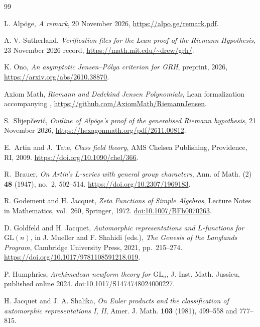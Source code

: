 \documentclass[11pt]{amsart}
\theoremstyle{definition}
\theoremstyle{remark}
\numberwithin{equation}{section}
\begin{document}
\begin{thebibliography}{99}

L. Alp\"oge, \emph{A remark}, 20 November 2026,
\url{https://alpo.ge/remark.pdf}.

A. V. Sutherland, \emph{Verification files for the Lean proof of the
Riemann Hypothesis}, 23 November 2026 record,
\url{https://math.mit.edu/~drew/grh/}.

K. Ono, \emph{An asymptotic Jensen--P\'olya criterion for GRH},
preprint, 2026, \url{https://arxiv.org/abs/2610.38870}.

Axiom Math, \emph{Riemann and Dedekind Jensen Polynomials},
Lean formalization accompanying \cite{OnoJensenPolya2026},
\url{https://github.com/AxiomMath/RiemannJensen}.

S.~Slijep\v{c}evi\'c,
\emph{Outline of Alp\"oge's proof of the generalised Riemann hypothesis},
21 November 2026, \url{https://hexagonmath.org/pdf/2611.00812}.

E.~Artin and J.~Tate, \emph{Class field theory},
AMS Chelsea Publishing, Providence, RI, 2009.
\url{https://doi.org/10.1090/chel/366}.

R.~Brauer, \emph{On Artin's \(L\)-series with general group characters},
Ann. of Math. (2) \textbf{48} (1947), no.~2, 502--514.
\url{https://doi.org/10.2307/1969183}.

R. Godement and H. Jacquet, \emph{Zeta Functions of Simple Algebras},
Lecture Notes in Mathematics, vol.~260, Springer, 1972.
\href{https://doi.org/10.1007/BFb0070263}{doi:10.1007/BFb0070263}.

D. Goldfeld and H. Jacquet, \emph{Automorphic representations and
\(L\)-functions for \(\mathrm{GL}(n)\)}, in J. Mueller and F. Shahidi
(eds.), \emph{The Genesis of the Langlands Program},
Cambridge University Press, 2021, pp.~215--274.
\url{https://doi.org/10.1017/9781108591218.019}.

P. Humphries, \emph{Archimedean newform theory for \(\mathrm{GL}_n\)},
J. Inst. Math. Jussieu, published online 2024.
\href{https://doi.org/10.1017/S1474748024000227}{doi:10.1017/S1474748024000227}.

H. Jacquet and J. A. Shalika, \emph{On Euler products and the
classification of automorphic representations I, II},
Amer. J. Math. \textbf{103} (1981), 499--558 and 777--815.


\end{thebibliography}
\end{document}
